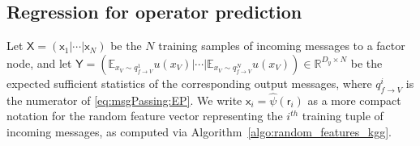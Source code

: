 \documentclass[english]{article}
\theoremstyle{plain}
\theoremstyle{plain}
\newcommand{\factor}{f}				%
\newcommand{\outV}{V}                         %
\begin{document}



\subsection{Regression for operator prediction}\label{sec:ridgeRegression}

Let $\mathsf{X}=\left(\mathsf{x}_{1}|\cdots|\mathsf{x}_{N}\right)$
be the $N$ training samples of incoming messages to a factor node, and let
$\mathsf{Y}=\left(\mathbb{E}_{x_V \sim q_{\factor\rightarrow
\outV}^{1}}u(x_{\outV})|\cdots|\mathbb{E}_{x_V \sim q_{f\rightarrow
\outV}^{N}}u(x_{\outV})\right)\in\mathbb{R}^{D_{y}\times N}$
be the expected sufficient statistics of the corresponding  output messages, 
where $q^i_{\factor \rightarrow \outV}$ is the numerator 
of \eqref{eq:msgPassing:EP}.
We write $\mathsf{x}_{i}= \hat{\psi}(\mathsf{r}_i)$
as a more compact notation for the random feature
vector representing the $i^{th}$ training tuple of incoming messages, 
as computed via Algorithm~\ref{algo:random_features_kgg}.
\end{document}
